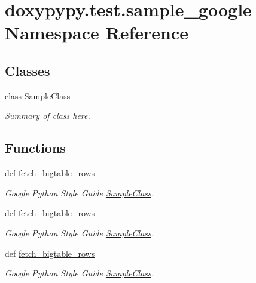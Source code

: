 \hypertarget{namespacedoxypypy_1_1test_1_1sample__google}{\section{doxypypy.\-test.\-sample\-\_\-google Namespace Reference}
\label{namespacedoxypypy_1_1test_1_1sample__google}
}
\subsection*{Classes}
\begin{DoxyCompactItemize}
\item 
class \hyperlink{classdoxypypy_1_1test_1_1sample__google_1_1_sample_class}{Sample\-Class}
\begin{DoxyCompactList}\small\item\em Summary of class here. \end{DoxyCompactList}\end{DoxyCompactItemize}
\subsection*{Functions}
\begin{DoxyCompactItemize}
\item 
def \hyperlink{namespacedoxypypy_1_1test_1_1sample__google_a69c20c6f312fac49385a9c76d93795ef}{fetch\-\_\-bigtable\-\_\-rows}
\begin{DoxyCompactList}\small\item\em Google Python Style Guide \hyperlink{classdoxypypy_1_1test_1_1sample__google_1_1_sample_class}{Sample\-Class}. \end{DoxyCompactList}\item 
def \hyperlink{namespacedoxypypy_1_1test_1_1sample__google_a69c20c6f312fac49385a9c76d93795ef}{fetch\-\_\-bigtable\-\_\-rows}
\begin{DoxyCompactList}\small\item\em Google Python Style Guide \hyperlink{classdoxypypy_1_1test_1_1sample__google_1_1_sample_class}{Sample\-Class}. \end{DoxyCompactList}\item 
def \hyperlink{namespacedoxypypy_1_1test_1_1sample__google_a7a1a38ce007375b16815879fac02f8e5}{fetch\-\_\-bigtable\-\_\-rows}
\begin{DoxyCompactList}\small\item\em Google Python Style Guide \hyperlink{classdoxypypy_1_1test_1_1sample__google_1_1_sample_class}{Sample\-Class}. \end{DoxyCompactList}\end{DoxyCompactItemize}

